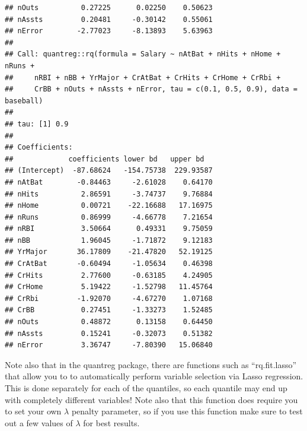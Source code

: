 \documentclass{article}\usepackage[]{graphicx}\usepackage[]{color}
\makeatletter
\newenvironment{kframe}{%
 \def\at@end@of@kframe{}%
 \ifinner\ifhmode%
  \def\at@end@of@kframe{\end{minipage}}%
  \begin{minipage}{\columnwidth}%
 \fi\fi%
 \def\FrameCommand##1{\hskip\@totalleftmargin \hskip-\fboxsep
 \colorbox{shadecolor}{##1}\hskip-\fboxsep
     \hskip-\linewidth \hskip-\@totalleftmargin \hskip\columnwidth}%
 \MakeFramed {\advance\hsize-\width
   \@totalleftmargin\z@ \linewidth\hsize
   \@setminipage}}%
 {\par\unskip\endMakeFramed%
 \at@end@of@kframe}
\newenvironment{knitrout}{}{} %
\makeatother
\begin{document}
\begin{knitrout}
\begin{kframe}
\begin{verbatim}
## nOuts          0.27225      0.02250    0.50623
## nAssts         0.20481     -0.30142    0.55061
## nError        -2.77023     -8.13893    5.63963
## 
## Call: quantreg::rq(formula = Salary ~ nAtBat + nHits + nHome + nRuns + 
##     nRBI + nBB + YrMajor + CrAtBat + CrHits + CrHome + CrRbi + 
##     CrBB + nOuts + nAssts + nError, tau = c(0.1, 0.5, 0.9), data = baseball)
## 
## tau: [1] 0.9
## 
## Coefficients:
##             coefficients lower bd   upper bd  
## (Intercept)  -87.68624   -154.75738  229.93587
## nAtBat        -0.84463     -2.61028    0.64170
## nHits          2.86591     -3.74737    9.76884
## nHome          0.00721    -22.16688   17.16975
## nRuns          0.86999     -4.66778    7.21654
## nRBI           3.50664      0.49331    9.75059
## nBB            1.96045     -1.71872    9.12183
## YrMajor       36.17809    -21.47820   52.19125
## CrAtBat       -0.60494     -1.05634    0.46398
## CrHits         2.77600     -0.63185    4.24905
## CrHome         5.19422     -1.52798   11.45764
## CrRbi         -1.92070     -4.67270    1.07168
## CrBB           0.27451     -1.33273    1.52485
## nOuts          0.48872      0.13158    0.64450
## nAssts         0.15241     -0.32073    0.51382
## nError         3.36747     -7.80390   15.06840
\end{verbatim}
\end{kframe}
\end{knitrout}

Note also that in the quantreg package, there are functions such as ``rq.fit.lasso'' that allow you to to automatically perform variable selection via Lasso regression. This is done separately for each of the quantiles, so each quantile may end up with completely different variables! Note also that this function does require you to set your own $\lambda$ penalty parameter, so if you use this function make sure to test out a few values of $\lambda$ for best results.
\end{document}
